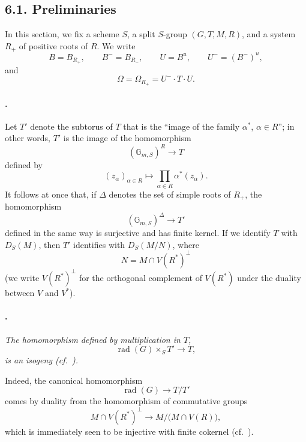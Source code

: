 \subsection*{6.1. Preliminaries}

In this section, we fix a scheme \(S\), a split \(S\)-group
\((G,T,M,R)\), and a system \(R_+\) of positive roots of \(R\).
We write
\[
  B=B_{R_+},\qquad B^-=B_{R_-},\qquad
  U=B^u,\qquad U^-=(B^-)^u,
\]
and
\[
  \Omega=\Omega_{R_+}=U^-\cdot T\cdot U.
\]

\paragraph{.}
Let \(T'\) denote the subtorus of \(T\) that is the ``image of the
family \(\alpha^*\), \(\alpha\in R\)''; in other words, \(T'\) is
the image of the homomorphism
\[
  (\mathbb G_{m,S})^R\longrightarrow T
\]
defined by
\[
  (z_\alpha)_{\alpha\in R}
  \longmapsto
  \prod_{\alpha\in R}\alpha^*(z_\alpha).
\]
It follows at once that, if \(\Delta\) denotes the set of simple
roots of \(R_+\), the homomorphism
\[
  (\mathbb G_{m,S})^\Delta\longrightarrow T'
\]
defined in the same way is surjective and has finite kernel. If
we identify \(T\) with \(D_S(M)\), then \(T'\) identifies with
\(D_S(M/N)\), where
\[
  N=M\cap V(R^*)^\perp
\]
\textup{(we write \(V(R^*)^\perp\) for the orthogonal complement
of \(V(R^*)\) under the duality between \(V\) and \(V^*\))}.

\paragraph{.}
{\itshape The homomorphism defined by multiplication in \(T\),
\[
  \operatorname{rad}(G)\times_S T'\longrightarrow T,
\]
is an isogeny \textup{(cf.\ )}.}

Indeed, the canonical homomorphism
\[
  \operatorname{rad}(G)\longrightarrow T/T'
\]
comes by duality from the homomorphism of commutative groups
\[
  M\cap V(R^*)^\perp
  \longrightarrow
  M\big/\bigl(M\cap V(R)\bigr),
\]
which is immediately seen to be injective with finite cokernel
\textup{(cf.\ )}.

